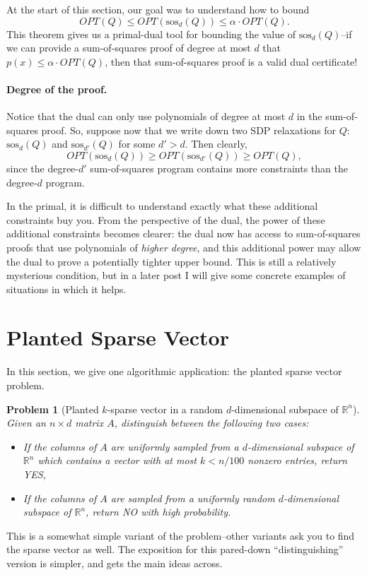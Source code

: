 \documentclass[a4paper,11pt]{article}
\newcommand{\R}{\mathbb{R}}
\newcommand{\sos}{\mathrm{sos}}
\newtheorem{problem}{Problem}
\theoremstyle{definition}
\begin{document}
At the start of this section, our goal was to understand how to bound
\[
OPT(Q) \le OPT(\sos_d(Q)) \le \alpha \cdot OPT(Q).
\]
This theorem gives us a primal-dual tool for bounding the value of $\sos_d(Q)$--{if we can provide a sum-of-squares proof of degree at most $d$ that $p(x) \le \alpha\cdot OPT(Q)$, then that sum-of-squares proof is a valid dual certificate!}

\paragraph{Degree of the proof.}
Notice that the dual can only use polynomials of degree at most $d$ in the sum-of-squares proof.
So, suppose now that we write down two SDP relaxations for $Q$: $\sos_d(Q)$ and $\sos_{d'}(Q)$ for some $d' > d$.
Then clearly,
\[
OPT(\sos_{d}(Q)) \ge OPT(\sos_{d'}(Q)) \ge OPT(Q),
\]
since the degree-$d'$ sum-of-squares program contains more constraints than the degree-$d$ program.

In the primal, it is difficult to understand exactly what these additional constraints buy you.
From the perspective of the dual, the power of these additional constraints becomes clearer: the dual now has access to sum-of-squares proofs that use polynomials of {\em higher degree}, and this additional power may allow the dual to prove a potentially tighter upper bound.
This is still a relatively mysterious condition, but in a later post I will give some concrete examples of situations in which it helps.



\section{Planted Sparse Vector}

In this section, we give one algorithmic application: the planted sparse vector problem.

\begin{problem}[Planted $k$-sparse vector in a random $d$-dimensional subspace of $\R^n$]
Given an $n \times d$ matrix $A$, distinguish between the following two cases:
\begin{itemize}
\item If the columns of $A$ are uniformly sampled from a $d$-dimensional subspace of $\R^n$ which contains a vector with at most $k < n/100$ nonzero entries, return YES,
\item If the columns of $A$ are sampled from a uniformly random $d$-dimensional subspace of $\R^n$, return NO with high probability.
\end{itemize}
\end{problem}
This is a somewhat simple variant of the problem--other variants ask you to find the sparse vector as well.
The exposition for this pared-down ``distinguishing'' version is simpler, and gets the main ideas across.
\end{document}
